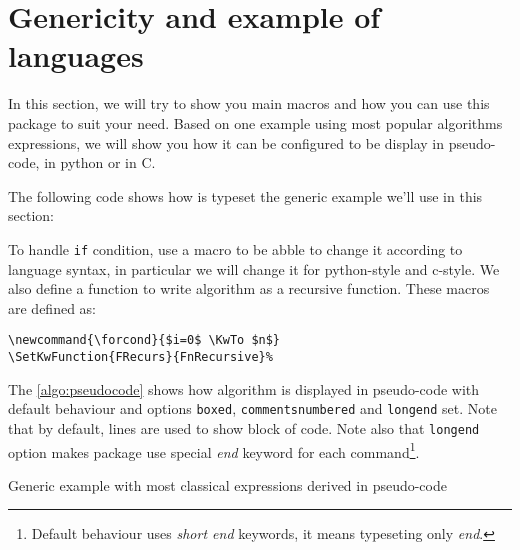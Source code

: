 \documentclass[a4paper]{article}
\begin{document}
\section{Genericity and example of languages}

In this section, we will try to show you main macros and how you can use this package to
suit your need. Based on one example using most popular algorithms expressions, we will
show you how it can be configured to be display in pseudo-code, in python or in C.

The following code shows how is typeset the generic example we'll use in this section:\par
{%
  \noindent\fbox{%
    \begin{minipage}[c]{\textwidth}%
    \end{minipage}\label{code:exgeneric}%
  }}%
\par\medskip
To handle \texttt{if} condition, use a macro to be abble to change it according to
language syntax, in particular we will change it for python-style and c-style. We also
define a function to write algorithm as a recursive function. These macros are defined as:\vspace{-1.5ex}
\begin{verbatim}
\newcommand{\forcond}{$i=0$ \KwTo $n$}
\SetKwFunction{FRecurs}{FnRecursive}%
\end{verbatim}

The \autoref{algo:pseudocode} shows how algorithm is displayed in pseudo-code with default
behaviour and options \texttt{boxed}, \texttt{commentsnumbered} and \texttt{longend}
set. Note that by default, lines are used to show block of code. Note also that
\texttt{longend} option makes package use special \emph{end} keyword for each
command\footnote{Default behaviour uses \emph{short end} keywords, it means typeseting only
  \emph{end}.}.
%
\newcommand{\forcond}{$i=0$ \KwTo $n$}
\begin{algorithm}\SetAlgoLongEnd
  \caption{Generic example with most classical expressions derived in pseudo-code}%
  \label{algo:pseudocode}
  
\end{algorithm}
\end{document}
